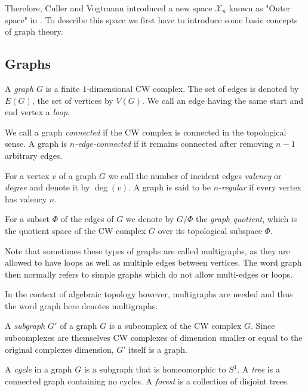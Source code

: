 Therefore, Culler and Vogtmann introduced a new space $\mathcal{X}_{n}$ known as "Outer space" in \cite{vogtmann86}.
To describe this space we first have to introduce some basic concepts of graph theory.

\subsection{Graphs}
\begin{definition}
	A \emph{graph} $G$ is a finite $1$-dimensional CW complex. The set of edges is denoted by $E(G)$, the set of vertices by  $V(G)$.
	We call an edge having the same start and end vertex a \emph{loop}.

	We call a graph \emph{connected} if the CW complex is connected in the topological sense.
	A graph is \emph{$n$-edge-connected} if it remains connected after removing  $n-1$ arbitrary edges.

	For a vertex $v$ of a graph  $G$ we call the number of incident edges \emph{valency} or \emph{degree} and denote it by $\deg(v)$.
	A graph is said to be \emph{$n$-regular} if every vertex has valency $n$.

	For a subset $\Phi$ of the edges of $G$ we denote by $G / \Phi$ the \emph{graph quotient}, which is the quotient space of the CW complex $G$ over its topological subspace $\Phi$.
\end{definition}

\begin{remark}
	Note that sometimes these types of graphs are called multigraphs, as they are allowed to have loops as well as multiple edges between vertices.
	The word graph then normally refers to simple graphs which do not allow multi-edges or loops.

	In the context of algebraic topology however, multigraphs are needed and thus the word graph here denotes multigraphs.
\end{remark}

\begin{definition}
	A \emph{subgraph} $G'$ of a graph $G$ is a subcomplex of the CW complex $G$. Since subcomplexes are themselves CW complexes of dimension smaller or equal to the original complexes
	dimension, $G'$ itself is a graph.

	 A \emph{cycle} in a graph $G$ is a subgraph that is homeomorphic to $S^1$. A \emph{tree} is a
	 connected graph containing no cycles. A \emph{forest} is a collection of disjoint trees.
\end{definition}

